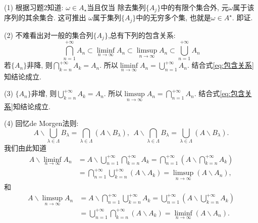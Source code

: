 \begin{yyProof}
	\begin{blist}
		\item[(1)] 根据习题2知道: $\omega\in A_\star$当且仅当
		除去集列$\{A_j\}$中的有限个集合外, 元$\omega$属于该序列的其余集合. 这可推出 $\omega$属于集列$\{A_j\}$中的无穷多个集, 也就是$\omega\in A^\star$. 即证.
		\item[(2)] 不难看出对一般的集合列$\{A_j\}$,总有下列的包含关系:
		\begin{equation}\label{eq:包含关系}
		\bigcap_{n=1}^{+\infty}A_n\subset \liminf_{n\to\infty}A_n \subset \limsup_{n\to\infty}A_n\subset \bigcup_{n=1}^{+\infty}A_n
		\end{equation}
		若$\{A_n\}$非降, 则$\bigcap_{k=n}^{+\infty}A_k = A_n$.
		所以$\liminf\limits_{n\to\infty} A_n = \bigcup_{n=1}^{+\infty}A_n$. 
		结合式\ref{eq:包含关系}知结论成立.
		\item[(3)] $\{A_n\}$非增, 则$\bigcup_{k=n}^{+\infty}A_k = A_n$.
		所以$\limsup\limits_{n\to\infty} A_n = \bigcap_{n=1}^{+\infty}A_n$.
		结合式\ref{eq:包含关系}知结论成立.
		\item[(4)] 回忆de Morgen法则:
		\begin{equation}
		A\backslash \bigcup_{\lambda\in\Lambda}B_{\lambda} = \bigcap_{\lambda\in\Lambda}(A\backslash B_{\lambda}),~~A\backslash \bigcap_{\lambda\in\Lambda}B_{\lambda} = \bigcup_{\lambda\in\Lambda}(A\backslash B_{\lambda}).
		\end{equation}
		我们由此知道
		\begin{align}
		A\backslash \liminf_{n\to\infty}A_n &= A\backslash \bigcup_{n=1}^{+\infty}\bigcap_{k=n}^{+\infty}A_k=\bigcap_{n=1}^{+\infty}\left( A\backslash \bigcap_{k=n}^{+\infty}A_k \right)\nonumber\\
		&= \bigcap_{n=1}^{+\infty}\bigcup_{k=n}^{+\infty}\left( A\backslash A_k \right)=\limsup_{n\to\infty}(A\backslash A_n),
		\end{align}
		和\begin{align}
		A\backslash \limsup_{n\to\infty}A_n &= A\backslash \bigcap_{n=1}^{+\infty}\bigcup_{k=n}^{+\infty}A_k=\bigcup_{n=1}^{+\infty}\left( A\backslash \bigcup_{k=n}^{+\infty}A_k \right)\nonumber\\
		&= \bigcup_{n=1}^{+\infty}\bigcap_{k=n}^{+\infty}\left( A\backslash A_k \right)=\liminf_{n\to\infty}(A\backslash A_n).
		\end{align}
	\end{blist}
\end{yyProof}


